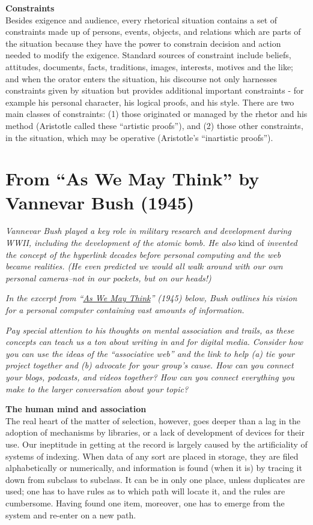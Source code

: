 \documentclass[]{book}
\theoremstyle{definition}
\theoremstyle{definition}
\theoremstyle{definition}
\theoremstyle{remark}
\begin{document}
\textbf{Constraints}\\
Besides exigence and audience, every rhetorical situation contains a set
of constraints made up of persons, events, objects, and relations which
are parts of the situation because they have the power to constrain
decision and action needed to modify the exigence. Standard sources of
constraint include beliefs, attitudes, documents, facts, traditions,
images, interests, motives and the like; and when the orator enters the
situation, his discourse not only harnesses constraints given by
situation but provides additional important constraints - for example
his personal character, his logical proofs, and his style. There are two
main classes of constraints: (1) those originated or managed by the
rhetor and his method (Aristotle called these ``artistic proofs''), and
(2) those other constraints, in the situation, which may be operative
(Aristotle's ``inartistic proofs'').

\hypertarget{from-as-we-may-think-by-vannevar-bush-1945}{%
\section{From ``As We May Think'' by Vannevar Bush
(1945)}\label{from-as-we-may-think-by-vannevar-bush-1945}}

\emph{Vannevar Bush played a key role in military research and
development during WWII, including the development of the atomic bomb.
He also }kind of \emph{invented the concept of the hyperlink decades
before personal computing and the web became realities. (He even
predicted we would all walk around with our own personal cameras--not in
our pockets, but on our heads!)}

\emph{In the excerpt from
``\href{https://www.theatlantic.com/magazine/archive/1945/07/as-we-may-think/303881/}{As
We May Think}'' (1945) below, Bush outlines his vision for a personal
computer containing vast amounts of information.}

\emph{Pay special attention to his thoughts on mental association and
trails, as these concepts can teach us a ton about writing in and for
digital media. Consider how you can use the ideas of the ``associative
web'' and the link to help (a) tie your project together and (b)
advocate for your group's cause. How can you connect your blogs,
podcasts, and videos together? How can you connect everything you make
to the larger conversation about your topic?}

\textbf{The human mind and association}\\
The real heart of the matter of selection, however, goes deeper than a
lag in the adoption of mechanisms by libraries, or a lack of development
of devices for their use. Our ineptitude in getting at the record is
largely caused by the artificiality of systems of indexing. When data of
any sort are placed in storage, they are filed alphabetically or
numerically, and information is found (when it is) by tracing it down
from subclass to subclass. It can be in only one place, unless
duplicates are used; one has to have rules as to which path will locate
it, and the rules are cumbersome. Having found one item, moreover, one
has to emerge from the system and re-enter on a new path.
\end{document}
